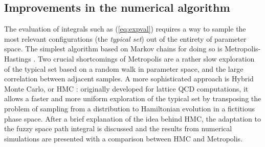 \subsection{Improvements in the numerical algorithm}
The evaluation of integrals such as (\ref{eq:expval}) requires a way to sample the most relevant configurations (the \textit{typical set}) out of the entirety of parameter space. The simplest algorithm based on Markov chains for doing so is Metropolis-Hastings \cite{hastings}. Two crucial shortcomings of Metropolis are a rather slow exploration of the typical set based on a random walk in parameter space, and the large correlation between adjacent samples. A more sophisticated approach is Hybrid Monte Carlo, or HMC \cite{duane}: originally developed for lattice QCD computations, it allows a faster and more uniform exploration of the typical set by transposing the problem of sampling from a distribution to Hamiltonian evolution in a fictitious phase space.\newline
After a brief explanation of the idea behind HMC, the adaptation to the fuzzy space path integral is discussed and the results from numerical simulations are presented with a comparison between HMC and Metropolis.


